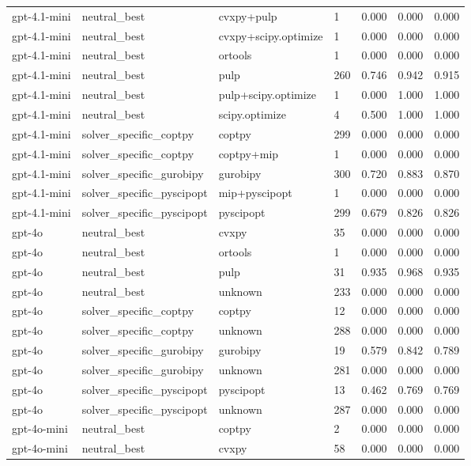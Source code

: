 \begin{table}[t]
\begin{tabular}{lllllll}
gpt-4.1-mini & neutral\_best & cvxpy+pulp & 1 & 0.000 & 0.000 & 0.000 \\
gpt-4.1-mini & neutral\_best & cvxpy+scipy.optimize & 1 & 0.000 & 0.000 & 0.000 \\
gpt-4.1-mini & neutral\_best & ortools & 1 & 0.000 & 0.000 & 0.000 \\
gpt-4.1-mini & neutral\_best & pulp & 260 & 0.746 & 0.942 & 0.915 \\
gpt-4.1-mini & neutral\_best & pulp+scipy.optimize & 1 & 0.000 & 1.000 & 1.000 \\
gpt-4.1-mini & neutral\_best & scipy.optimize & 4 & 0.500 & 1.000 & 1.000 \\
gpt-4.1-mini & solver\_specific\_coptpy & coptpy & 299 & 0.000 & 0.000 & 0.000 \\
gpt-4.1-mini & solver\_specific\_coptpy & coptpy+mip & 1 & 0.000 & 0.000 & 0.000 \\
gpt-4.1-mini & solver\_specific\_gurobipy & gurobipy & 300 & 0.720 & 0.883 & 0.870 \\
gpt-4.1-mini & solver\_specific\_pyscipopt & mip+pyscipopt & 1 & 0.000 & 0.000 & 0.000 \\
gpt-4.1-mini & solver\_specific\_pyscipopt & pyscipopt & 299 & 0.679 & 0.826 & 0.826 \\
gpt-4o & neutral\_best & cvxpy & 35 & 0.000 & 0.000 & 0.000 \\
gpt-4o & neutral\_best & ortools & 1 & 0.000 & 0.000 & 0.000 \\
gpt-4o & neutral\_best & pulp & 31 & 0.935 & 0.968 & 0.935 \\
gpt-4o & neutral\_best & unknown & 233 & 0.000 & 0.000 & 0.000 \\
gpt-4o & solver\_specific\_coptpy & coptpy & 12 & 0.000 & 0.000 & 0.000 \\
gpt-4o & solver\_specific\_coptpy & unknown & 288 & 0.000 & 0.000 & 0.000 \\
gpt-4o & solver\_specific\_gurobipy & gurobipy & 19 & 0.579 & 0.842 & 0.789 \\
gpt-4o & solver\_specific\_gurobipy & unknown & 281 & 0.000 & 0.000 & 0.000 \\
gpt-4o & solver\_specific\_pyscipopt & pyscipopt & 13 & 0.462 & 0.769 & 0.769 \\
gpt-4o & solver\_specific\_pyscipopt & unknown & 287 & 0.000 & 0.000 & 0.000 \\
gpt-4o-mini & neutral\_best & coptpy & 2 & 0.000 & 0.000 & 0.000 \\
gpt-4o-mini & neutral\_best & cvxpy & 58 & 0.000 & 0.000 & 0.000 \\

\end{tabular}
\end{table}
